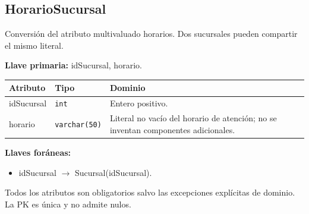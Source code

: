 \par\noindent\begin{minipage}{\textwidth}
\subsection{HorarioSucursal}
Conversión del atributo multivaluado horarios. Dos sucursales pueden compartir el mismo literal.\par
\textbf{Llave primaria:} idSucursal, horario.\par
{\small\begin{tabular}{@{}p{}p{}p{}@{}}
\toprule Atributo & Tipo & Dominio \\ \midrule
idSucursal & \texttt{int} & Entero positivo. \\
horario & \texttt{varchar(50)} & Literal no vacío del horario de atención; no se inventan componentes adicionales. \\
\bottomrule\end{tabular}}
\textbf{Llaves foráneas:}\begin{itemize}[nosep]
\item idSucursal $\rightarrow$ Sucursal(idSucursal).
\end{itemize}
Todos los atributos son obligatorios salvo las excepciones explícitas de dominio. La PK es única y no admite nulos.
\end{minipage}\par\vspace{.35cm}
